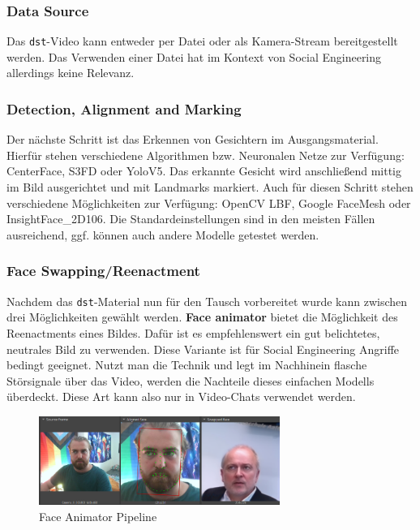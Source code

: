 \subsubsection*{Data Source}
Das \texttt{dst}-Video kann entweder per Datei oder als Kamera-Stream bereitgestellt werden.
Das Verwenden einer Datei hat im Kontext von Social Engineering allerdings keine Relevanz.

\subsubsection*{Detection, Alignment and Marking}
Der nächste Schritt ist das Erkennen von Gesichtern im Ausgangsmaterial.
Hierfür stehen verschiedene Algorithmen bzw. Neuronalen Netze zur Verfügung: CenterFace, S3FD oder YoloV5.
Das erkannte Gesicht wird anschließend mittig im Bild ausgerichtet und mit Landmarks markiert.
Auch für diesen Schritt stehen verschiedene Möglichkeiten zur Verfügung: OpenCV LBF, Google FaceMesh oder InsightFace\_2D106.
Die Standardeinstellungen sind in den meisten Fällen ausreichend, ggf. können auch andere Modelle getestet werden.

\subsubsection*{Face Swapping/Reenactment}
Nachdem das \texttt{dst}-Material nun für den Tausch vorbereitet wurde kann zwischen drei Möglichkeiten gewählt werden.
\textbf{Face animator} bietet die Möglichkeit des Reenactments eines Bildes.
Dafür ist es empfehlenswert ein gut belichtetes, neutrales Bild zu verwenden.
Diese Variante ist für Social Engineering Angriffe bedingt geeignet.
Nutzt man die Technik und legt im Nachhinein flasche Störsignale über das Video, werden die Nachteile dieses einfachen Modells überdeckt.
Diese Art kann also nur in Video-Chats verwendet werden.
\begin{figure}[h]
    \center
    \includegraphics[width=0.7\textwidth]{Bilder/DFLive/face-animator}
    \caption{Face Animator Pipeline}
    \label{fig:dflive-reenactment}
\end{figure}

